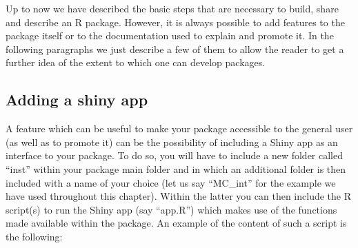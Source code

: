 \documentclass[12pt,]{krantz}
\begin{document}
Up to now we have described the basic steps that are necessary to build,
share and describe an R package. However, it is always possible to add
features to the package itself or to the documentation used to explain
and promote it. In the following paragraphs we just describe a few of
them to allow the reader to get a further idea of the extent to which
one can develop packages.

\subsection{Adding a shiny app}\label{adding-a-shiny-app}

A feature which can be useful to make your package accessible to the
general user (as well as to promote it) can be the possibility of
including a Shiny app as an interface to your package. To do so, you
will have to include a new folder called ``inst'' within your package
main folder and in which an additional folder is then included with a
name of your choice (let us say ``MC\_int'' for the example we have used
throughout this chapter). Within the latter you can then include the R
script(s) to run the Shiny app (say ``app.R'') which makes use of the
functions made available within the package. An example of the content
of such a script is the following:
\end{document}
